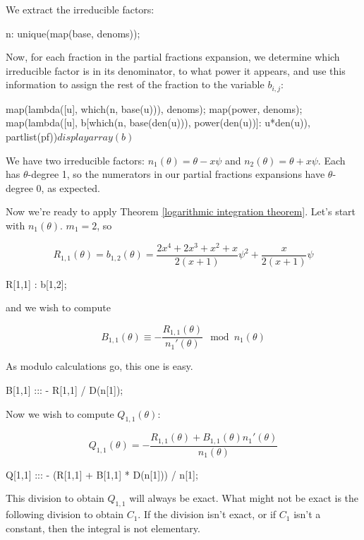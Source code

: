 We extract the irreducible factors:

\begin{maximacode}
n: unique(map(base, denoms));
\end{maximacode}

Now, for each fraction in the partial fractions
expansion, we determine which irreducible
factor is in its denominator, to what power
it appears, and use this information to
assign the rest of the fraction to the
variable $b_{i,j}$:

\begin{maximacode}
map(lambda([u], which(n, base(u))), denoms);
map(power, denoms);
map(lambda([u],
       b[which(n, base(den(u))),
         power(den(u))]: u*den(u)),
    partlist(pf))$
displayarray(b)$
\end{maximacode}


We have two irreducible factors: $n_1(\theta) = \theta - x \psi$ and
$n_2(\theta) = \theta + x \psi$.  Each has $\theta$-degree 1, so
the numerators in our partial fractions expansions have
$\theta$-degree 0, as expected.

Now we're ready to apply
Theorem \ref{logarithmic integration theorem}.  Let's start with
$n_1(\theta)$.  $m_1=2$, so

$$R_{1,1}(\theta) = b_{1,2}(\theta) = \frac{2x^4+2x^3+x^2+x}{2(x+1)}\psi^2 + \frac{x}{2(x+1)} \psi$$

\begin{maximacode}
R[1,1] : b[1,2];
\end{maximacode}

and we wish to compute

$$ B_{1,1}(\theta) \equiv - \frac{R_{1,1}(\theta)}{n_1'(\theta) } \mod n_1(\theta)$$

As modulo calculations go, this one is easy.

\begin{maximacode}
B[1,1] ::: - R[1,1] / D(n[1]);
\end{maximacode}

Now we wish to compute $Q_{1,1}(\theta)$:

$$ Q_{1,1}(\theta) = - \frac{R_{1,1}(\theta) + B_{1,1}(\theta) n_1'(\theta)}{n_1(\theta)}$$

\begin{maximacode}
Q[1,1] :::
   - (R[1,1] + B[1,1] * D(n[1])) / n[1];
\end{maximacode}

This division to obtain $Q_{1,1}$ will always be exact.  What might not be exact is the following division
to obtain $C_{1}$.  If the division isn't exact, or if $C_1$ isn't a constant, then the integral is not elementary.

